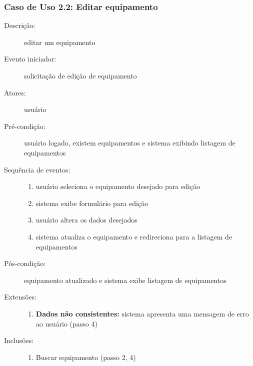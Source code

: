 \subsubsection{Caso de Uso 2.2: Editar equipamento}
\begin{description}
	\item[Descrição:] editar um equipamento
	\item[Evento iniciador:] solicitação de edição de equipamento
	\item[Atores:] usuário
	\item[Pré-condição:] usuário logado, existem equipamentos e sistema exibindo listagem de equipamentos
	\item[Sequência de eventos:] \hfill
		\begin{enumerate}
			\item{usuário seleciona o equipamento desejado para edição}
			\item{sistema exibe formulário para edição}
			\item{usuário altera os dados desejados}
			\item{sistema atualiza o equipamento e redireciona para a listagem de equipamentos}
		\end{enumerate}
	\item[Pós-condição:] equipamento atualizado e sistema exibe listagem de equipamentos
	\item[Extensões:] \hfill
		\begin{enumerate}
			\item{\textbf{Dados não consistentes:} sistema apresenta uma mensagem de erro ao usuário (passo 4)}
		\end{enumerate}
	\item[Inclusões:] \hfill
		\begin{enumerate}
			\item{Buscar equipamento (passo 2, 4)}
		\end{enumerate}
\end{description}
%
